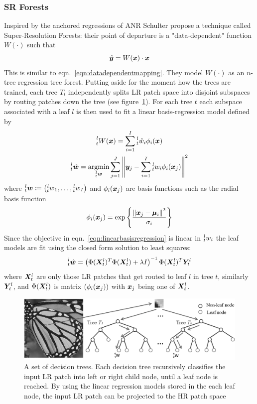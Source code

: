 \subsubsection{SR Forests}
Inspired by the anchored regressions of ANR Schulter \etal\cite{Schulter2015} propose a technique called Super-Resolution Forests: their point of departure is a "data-dependent" function $W(\cdot)$ such that
\begin{equation}
	\hat{\bm{y}} = W(\bm{x}) \cdot \bm{x}
\end{equation}
This is similar to eqn.~\eqref{eqn:datadependentmapping}.
%
They model $W(\cdot)$ as an $n$-tree regression tree forest.
%
Putting aside for the moment how the trees are trained, each tree $T_t$ independently splits LR patch space into disjoint subspaces by routing patches down the tree (see figure~\ref{fig:firf}).
%
For each tree $t$ each subspace associated with a leaf $l$ is then used to fit a linear basis-regression model defined by
\begin{gather}
	\prescript{l}{t}{W(\bx)} = \sum_{i=1}^I \prescript{l}{t}{\hat{w}_i}\phi_i(\bx) \\
	\prescript{l}{t}{\hat{\bm{w}}} = \underset{\prescript{l}{t}{\bm{w}}}{\text{argmin}} \sum_{j=1}^J \left\| \by_j - \sum_{i=1}^I \prescript{l}{t}{w_i}\phi_i(\bx_j) \right\|^2
	\label{eqn:linearbasisregression}
\end{gather}
where $\prescript{l}{t}{\bm{w}} \coloneqq \left( \prescript{l}{t}{w}_1, \mathellipsis, \prescript{l}{t}{w}_I \right)$ and $\phi_i(\bm{x}_j)$ are basis functions such as the radial basis function
\begin{equation}
	\phi_i(\bm{x}_j) = \exp \left\{ \frac{\left\| \bm{x}_j - \bm{\mu}_i \right\|^2}{\sigma_i} \right\}
\end{equation}
Since the objective in eqn.~\eqref{eqn:linearbasisregression} is linear in $\prescript{l}{t}{w}_i$ the leaf models are fit using the closed form solution to least squares:
\begin{equation}
	\prescript{l}{t}{\hat{\bm{w}}} = \left( \Phi(\bm{X}_t^l)^T \Phi(\bm{X}_t^l) + \lambda I \right)^{-1} \Phi(\bm{X}_t^l)^T \bm{Y}_t^l
\end{equation}
where $\bm{X}_t^l$ are only those LR patches that get routed to leaf $l$ in tree $t$, similarly $\bm{Y}_t^l$, and $\Phi(\bm{X}_t^l)$ is matrix $\left( \phi_i(\bm{x}_j) \right)$ with $\bm{x}_j$ being one of $\bm{X}_t^l$.
%
\begin{figure}
	\centering
	\includegraphics[width=\linewidth,keepaspectratio]{figures/FIRF.png}
	\caption{A set of decision trees. Each decision tree recursively classifies the input LR patch into left or right child node, until a leaf node is reached. By using the linear regression models stored in the each leaf node, the input LR patch can be projected to the HR patch space\cite{Huang}}
	\label{fig:firf}
\end{figure}
